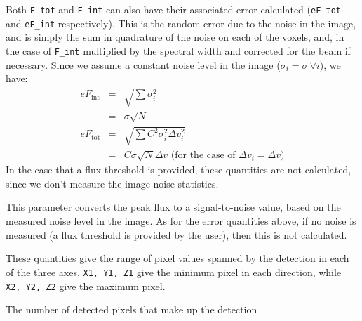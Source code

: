
Both \texttt{F\_tot} and \texttt{F\_int} can also have their
associated error calculated (\texttt{eF\_tot} and \texttt{eF\_int}
respectively). This is the random error due to the noise in the image,
and is simply the sum in quadrature of the noise on each of the
voxels, and, in the case of \texttt{F\_int} multiplied by the spectral
width and corrected for the beam if necessary. Since we assume a
constant noise level in the image ($\sigma_i=\sigma\  \forall i$), we
have:
\begin{eqnarray*}
eF_\text{int} &= & \sqrt{\sum\sigma_i^2} \\&= &\sigma \sqrt{N}\\
eF_\text{tot} &= & \sqrt{\sum C^2\sigma_i^2 \Delta v_i^2} \\&= &C \sigma
\sqrt{N} \Delta v \text{ (for the case of $\Delta v_i = \Delta v$)}
\end{eqnarray*}
In the case that a flux threshold is provided, these quantities are
not calculated, since we don't measure the image noise
statistics. 



This parameter converts the peak flux to a signal-to-noise value,
based on the measured noise level in the image. As for the error
quantities above, if no noise is measured (\ie a flux threshold is
provided by the user), then this is not calculated.


These quantities give the range of pixel values spanned by the
detection in each of the three axes. \texttt{X1, Y1, Z1} give the
minimum pixel in each direction, while \texttt{X2, Y2, Z2} give the
maximum pixel.


The number of detected pixels that make up the detection 

\label{sec-flags}

